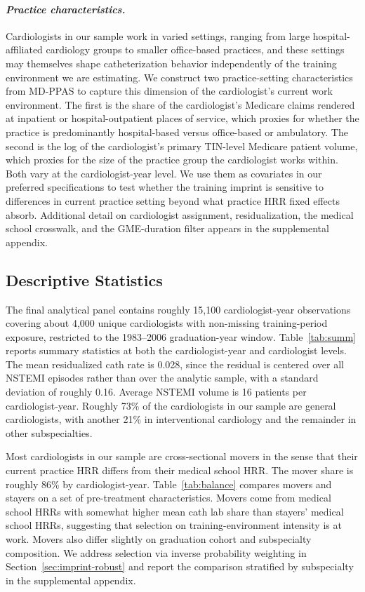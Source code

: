 \documentclass[12pt]{article}
\begin{document}
\paragraph{\textit{Practice characteristics.}}
Cardiologists in our sample work in varied settings, ranging from large hospital-affiliated cardiology groups to smaller office-based practices, and these settings may themselves shape catheterization behavior independently of the training environment we are estimating. We construct two practice-setting characteristics from MD-PPAS to capture this dimension of the cardiologist's current work environment. The first is the share of the cardiologist's Medicare claims rendered at inpatient or hospital-outpatient places of service, which proxies for whether the practice is predominantly hospital-based versus office-based or ambulatory. The second is the log of the cardiologist's primary TIN-level Medicare patient volume, which proxies for the size of the practice group the cardiologist works within. Both vary at the cardiologist-year level. We use them as covariates in our preferred specifications to test whether the training imprint is sensitive to differences in current practice setting beyond what practice HRR fixed effects absorb. Additional detail on cardiologist assignment, residualization, the medical school crosswalk, and the GME-duration filter appears in the supplemental appendix.

\subsection{Descriptive Statistics}\label{sec:desc}

The final analytical panel contains roughly 15,100 cardiologist-year observations covering about 4,000 unique cardiologists with non-missing training-period exposure, restricted to the 1983--2006 graduation-year window. Table~\ref{tab:summ} reports summary statistics at both the cardiologist-year and cardiologist levels. The mean residualized cath rate is 0.028, since the residual is centered over all NSTEMI episodes rather than over the analytic sample, with a standard deviation of roughly 0.16. Average NSTEMI volume is 16 patients per cardiologist-year. Roughly 73\% of the cardiologists in our sample are general cardiologists, with another 21\% in interventional cardiology and the remainder in other subspecialties.

Most cardiologists in our sample are cross-sectional movers in the sense that their current practice HRR differs from their medical school HRR. The mover share is roughly 86\% by cardiologist-year. Table~\ref{tab:balance} compares movers and stayers on a set of pre-treatment characteristics. Movers come from medical school HRRs with somewhat higher mean cath lab share than stayers' medical school HRRs, suggesting that selection on training-environment intensity is at work. Movers also differ slightly on graduation cohort and subspecialty composition. We address selection via inverse probability weighting in Section~\ref{sec:imprint-robust} and report the comparison stratified by subspecialty in the supplemental appendix.
\end{document}
